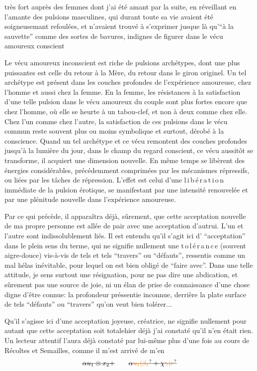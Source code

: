 très fort auprès des femmes dont j'ai été amant par la suite, en réveillant en l'amante des pulsions masculines, qui durant toute sa vie avaient été soigneusemant refoulées, et n'avaient trouvé à s'exprimer jusque là qu'``à la sauvette'' comme des sortes de bavures, indignes de figurer dans le vécu amoureux conscient

Le vécu amoureux inconscient est riche de pulsions archétypes, dont une  plus puissantes est celle du retour à la Mère, du retour dans le giron originel. Un tel archétype est présent dans les couches profondes de l'expérience amoureuse, chez l'homme et aussi chez la femme. En la femme, les résistances à la satisfaction d'une telle pulsion dans le vécu amoureux du couple sont plus fortes encore que chez l'homme, où elle se heurte à un tabou-clef, et non à deux comme chez elle. Chez l'un comme chez l'autre, la satisfaction de ces pulsions \unsure{\textperiodcentered|}dans le vécu commun reste souvent plus ou moins symbolique et surtout, dérobé à la conscience. Quand un tel archétype et ce vécu remontent des couches profondes jusqu'à la lumière du jour, dans le champ du regard conscient, ce vécu aussitôt se transforme, il acquiert une dimension nouvelle. En même temps se libèrent des énergies considérables, précédemment comprimées par les mécanismes répressifs, ou liées par les tâches de répression. L'effet est celui d'une l\,i\,b\,é\,r\,a\,t\,i\,o\,n immédiate de la pulsion érotique, se manifestant par une intensité renouvelée et par une plénitude nouvelle dans l'expérience amoureuse.

Par ce qui précède, il apparaîtra déjà, sûrement, que cette acceptation nouvelle de ma propre personne est allée de pair avec une acceptation d'autrui. L'un et l'autre sont indissolublement liés. Il est entendu qu'il s'agit ici d' ``acceptation'' dans le plein sens du terme, qui ne signifie nullement une t\,o\,l\,é\,r\,a\,n\,c\,e (souvent aigre-douce) vis-à-vis de tels et tels ``travers'' ou ``défauts'', ressentis comme un mal hélas inévitable, pour lequel on est bien obligé de ``faire avec''. Dans une telle attitude, je sens surtout une résignation, pour ne pas dire une abdication, et sûrement pas une source de joie, ni un élan de prise de connaissance d'une chose digne d'être connue: la profondeur préssentie\handwritten{,} inconnue, derrière la plate surface de tels ``défauts'' ou ``travers'' qu'on veut bien tolérer...

Qu'il s'agisse ici d'une acceptation joyeuse, créatrice, ne signifie nullement pour autant que cette acceptation soit totale\handwritten{-}hier déjà j'ai constaté qu'il n'en était rien. Un lecteur attentif l'aura déjà constaté par lui-même plus d'une fois au cours de Récoltes et Semailles, comme il m'est arrivé de m'en
\[\deleted{\alpha u_1\otimes x_2+}\qquad\deleted{\alpha\unsure{u_1|\beta_1}+\chi\unsure{\gamma|r}}\]


